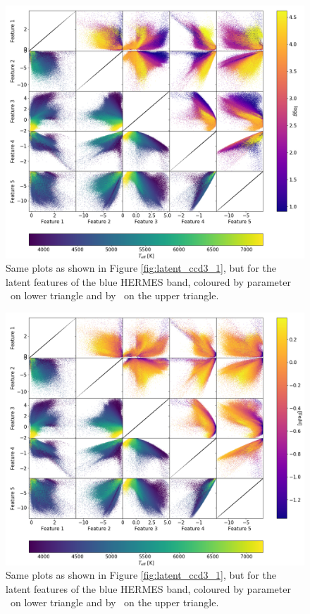 \begin{figure}
	\centering
	\includegraphics[width=\textwidth]{encoded_features_scatter_teff_logg_ccd1.png}
	\caption{Same plots as shown in Figure \ref{fig:latent_ccd3_1}, but for the latent features of the blue HERMES band, coloured by parameter \Teff\ on lower triangle and by \Logg\ on the upper triangle.}
	\label{fig:latent_ccd1_1}
\end{figure}

\begin{figure}
	\centering
	\includegraphics[width=\textwidth]{encoded_features_scatter_teff_fe_h_ccd1.png}
	\caption{Same plots as shown in Figure \ref{fig:latent_ccd3_1}, but for the latent features of the blue HERMES band, coloured by parameter \Teff\ on lower triangle and by \Feh\ on the upper triangle.}
	\label{fig:latent_ccd1_2}
\end{figure}

